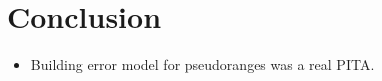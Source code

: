\chapter{Conclusion}
\label{chap:conclusion}

\begin{itemize}
\item Building error model for pseudoranges was a real PITA.
\end{itemize}
